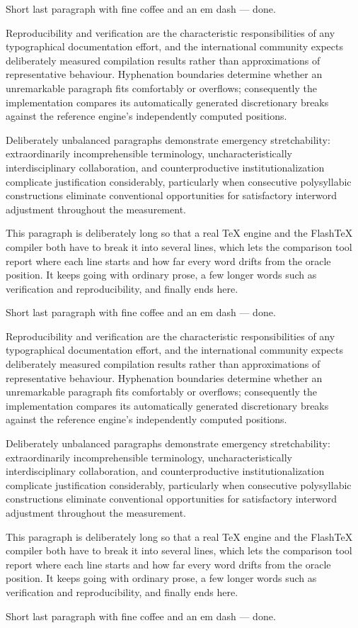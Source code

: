 \documentclass[12pt]{article}
\begin{document}
Short last paragraph with fine coffee and an em dash --- done.

Reproducibility and verification are the characteristic responsibilities of any typographical documentation effort, and the international community expects deliberately measured compilation results rather than approximations of representative behaviour. Hyphenation boundaries determine whether an unremarkable paragraph fits comfortably or overflows; consequently the implementation compares its automatically generated discretionary breaks against the reference engine's independently computed positions.

Deliberately unbalanced paragraphs demonstrate emergency stretchability: extraordinarily incomprehensible terminology, uncharacteristically interdisciplinary collaboration, and counterproductive institutionalization complicate justification considerably, particularly when consecutive polysyllabic constructions eliminate conventional opportunities for satisfactory interword adjustment throughout the measurement.

This paragraph is deliberately long so that a real TeX engine and the FlashTeX compiler both have to break it into several lines, which lets the comparison tool report where each line starts and how far every word drifts from the oracle position. It keeps going with ordinary prose, a few longer words such as verification and reproducibility, and finally ends here.

Short last paragraph with fine coffee and an em dash --- done.

Reproducibility and verification are the characteristic responsibilities of any typographical documentation effort, and the international community expects deliberately measured compilation results rather than approximations of representative behaviour. Hyphenation boundaries determine whether an unremarkable paragraph fits comfortably or overflows; consequently the implementation compares its automatically generated discretionary breaks against the reference engine's independently computed positions.

Deliberately unbalanced paragraphs demonstrate emergency stretchability: extraordinarily incomprehensible terminology, uncharacteristically interdisciplinary collaboration, and counterproductive institutionalization complicate justification considerably, particularly when consecutive polysyllabic constructions eliminate conventional opportunities for satisfactory interword adjustment throughout the measurement.

This paragraph is deliberately long so that a real TeX engine and the FlashTeX compiler both have to break it into several lines, which lets the comparison tool report where each line starts and how far every word drifts from the oracle position. It keeps going with ordinary prose, a few longer words such as verification and reproducibility, and finally ends here.

Short last paragraph with fine coffee and an em dash --- done.
\end{document}
